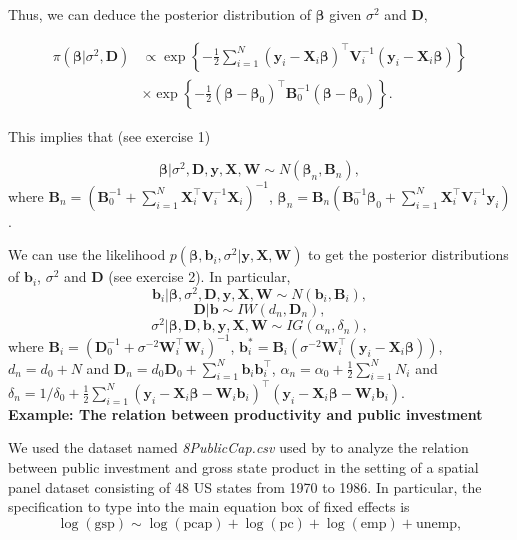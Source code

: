 Thus, we can deduce the posterior distribution of $\bm{\beta}$ given $\sigma^2$ and $\bm{D}$,

\begin{align*}
	\pi(\bm{\beta}|\sigma^2, \bm{D}) & \propto \exp\left\{-\frac{1}{2}\sum_{i=1}^N(\bm{y}_i-\bm{X}_i\bm{\beta})^{\top}\bm{V}_i^{-1}(\bm{y}_i-\bm{X}_i\bm{\beta})\right\}\\
	&\times \exp\left\{-\frac{1}{2}(\bm{\beta}-\bm{\beta}_0)^{\top}\bm{B}_0^{-1}(\bm{\beta}-\bm{\beta}_0)\right\}.
\end{align*} 

This implies that (see exercise 1)  

\begin{equation*}
	\bm{\beta}|\sigma^2,\bm{D},\bm{y}, \bm{X}, \bm{W} \sim {N}(\bm{\beta}_n,\bm{B}_n), 
\end{equation*}
where $\bm{B}_n = (\bm{B}_0^{-1} +\sum_{i=1}^N \bm{X}_i^{\top}\bm{V}_i^{-1}\bm{X}_i)^{-1}$, $\bm{\beta}_n= \bm{B}_n(\bm{B}_0^{-1}\bm{\beta}_0 + \sum_{i=1}^N\bm{X}_i^{\top}\bm{V}_i^{-1}\bm{y}_i)$.

We can use the likelihood $p(\bm{\beta},\bm{b}_i,\sigma^2|\bm{y}, \bm{X},\bm{W})$ to get the posterior distributions of $\bm{b}_i$, $\sigma^2$ and $\bm{D}$ (see exercise 2). In particular,
\begin{equation*}
	\bm{b}_i|\bm{\beta},\sigma^2,\bm{D},\bm{y}, \bm{X}, \bm{W} \sim {N}(\bm{b}_i,\bm{B}_i), 
\end{equation*}
\begin{equation*}
	\bm{D}| \bm{b} \sim {I}{W}(d_n, \bm{D}_n),
\end{equation*}
\begin{equation*}
	\sigma^2| \bm{\beta}, \bm{D}, \bm{b}, \bm{y}, \bm{X}, \bm{W} \sim {I}{G}(\alpha_n, \delta_n),
\end{equation*}
where $\bm{B}_i = (\bm{D}^{-1}_0 +\sigma^{-2} \bm{W}_i^{\top}\bm{W}_i)^{-1}$, $\bm{b}_i^*= \bm{B}_i(\sigma^{-2} \bm{W}_i^{\top}(\bm{y}_i-\bm{X}_i\bm{\beta}))$, $d_n = d_0 + N$ and $\bm{D}_n = d_0\bm{D}_0 + \sum_{i=1}^N \bm{b}_i\bm{b}_i^{\top}$, $\alpha_n=\alpha_0+\frac{1}{2}\sum_{i=1}^N N_i$ and $\delta_n=1/\delta_0+\frac{1}{2}\sum_{i=1}^N(\bm{y}_i-\bm{X}_i\bm{\beta}-\bm{W}_i\bm{b}_i)^{\top}(\bm{y}_i-\bm{X}_i\bm{\beta}-\bm{W}_i\bm{b}_i)$.\\ 

\textbf{Example: The relation between productivity and public investment}

We used the dataset named \textit{8PublicCap.csv} used by \cite{Ramirez2017} to analyze the relation  between public investment and gross state product in the setting of a spatial panel dataset consisting of 48 US states from 1970 to 1986.
In particular, the specification to type into the main equation box of fixed effects is
$$\log(\text{gsp})\sim\log(\text{pcap})+\log(\text{pc})+\log(\text{emp})+\text{unemp},$$

